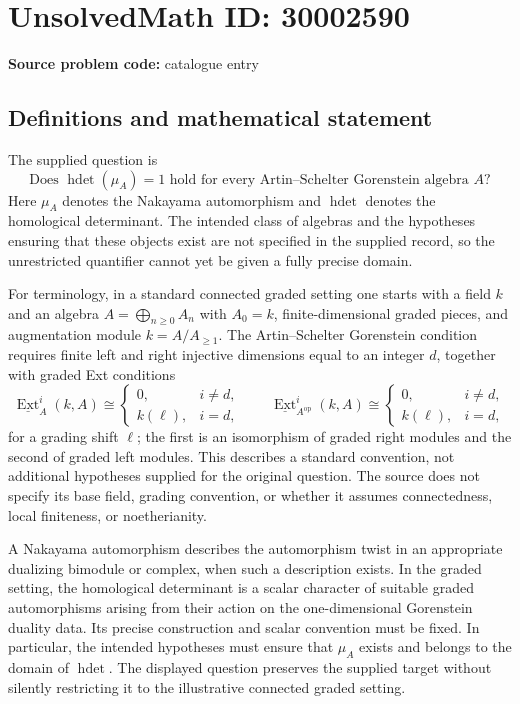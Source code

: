 \documentclass[11pt]{article}
\begin{document}
\section*{UnsolvedMath ID: 30002590}
\textbf{Source problem code:} catalogue entry
\subsection{Definitions and mathematical statement}
The supplied question is
\[
\text{Does }\operatorname{hdet}(\mu_A)=1\text{ hold for every Artin--Schelter Gorenstein algebra }A?
\]
Here \(\mu_A\) denotes the Nakayama automorphism and \(\operatorname{hdet}\) denotes the homological determinant. The intended class of algebras and the hypotheses ensuring that these objects exist are not specified in the supplied record, so the unrestricted quantifier cannot yet be given a fully precise domain.

For terminology, in a standard connected graded setting one starts with a field \(k\) and an algebra \(A=\bigoplus_{n\geq0}A_n\) with \(A_0=k\), finite-dimensional graded pieces, and augmentation module \(k=A/A_{\geq1}\). The Artin--Schelter Gorenstein condition requires finite left and right injective dimensions equal to an integer \(d\), together with graded Ext conditions
\[
\underline{\operatorname{Ext}}^i_A(k,A)\cong
\begin{cases}
0,&i\ne d,\\
k(\ell),&i=d,
\end{cases}
\qquad
\underline{\operatorname{Ext}}^i_{A^{\mathrm{op}}}(k,A)\cong
\begin{cases}
0,&i\ne d,\\
k(\ell),&i=d,
\end{cases}
\]
for a grading shift \(\ell\); the first is an isomorphism of graded right modules and the second of graded left modules. This describes a standard convention, not additional hypotheses supplied for the original question. The source does not specify its base field, grading convention, or whether it assumes connectedness, local finiteness, or noetherianity.

A Nakayama automorphism describes the automorphism twist in an appropriate dualizing bimodule or complex, when such a description exists. In the graded setting, the homological determinant is a scalar character of suitable graded automorphisms arising from their action on the one-dimensional Gorenstein duality data. Its precise construction and scalar convention must be fixed. In particular, the intended hypotheses must ensure that \(\mu_A\) exists and belongs to the domain of \(\operatorname{hdet}\). The displayed question preserves the supplied target without silently restricting it to the illustrative connected graded setting.
\end{document}
